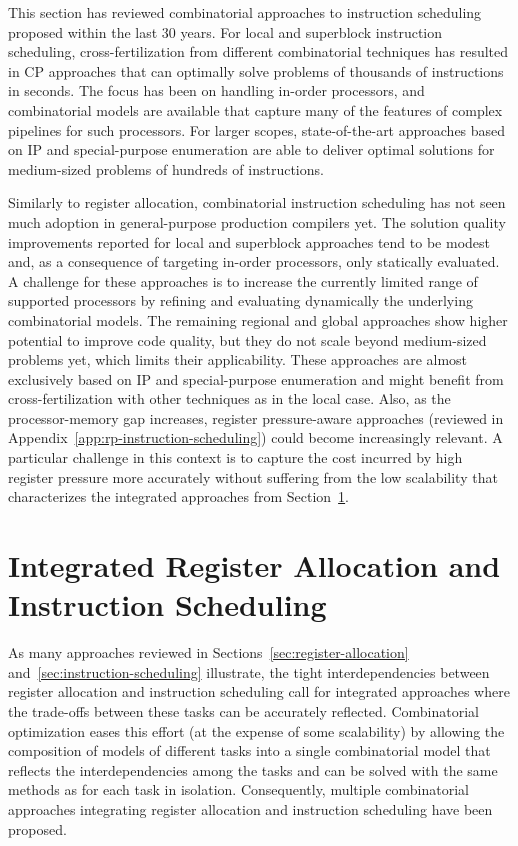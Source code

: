 \documentclass[acmsmall,authorversion,nonacm]{acmart}
\begin{document}
This section has reviewed combinatorial approaches to instruction
scheduling proposed within the last 30 years.
For local and superblock instruction scheduling, cross-fertilization
from different combinatorial techniques has resulted in CP approaches
that can optimally solve problems of thousands of instructions in
seconds.
The focus has been on handling in-order processors, and combinatorial
models are available that capture many of the features of complex
pipelines for such processors.
For larger scopes, state-of-the-art approaches based on IP and
special-purpose enumeration are able to deliver optimal solutions for
medium-sized problems of hundreds of instructions.

Similarly to register allocation, combinatorial instruction scheduling
has not seen much adoption in general-purpose production compilers
yet.
The solution quality improvements reported for local and superblock
approaches tend to be modest and, as a consequence of targeting
in-order processors, only statically evaluated.
A challenge for these approaches is to increase the currently limited
range of supported processors by refining and evaluating dynamically
the underlying combinatorial models.
The remaining regional and global approaches show higher potential to
improve code quality, but they do not scale beyond medium-sized
problems yet, which limits their applicability.
These approaches are almost exclusively based on IP and
special-purpose enumeration and might benefit from cross-fertilization
with other techniques as in the local case.
Also, as the processor-memory gap increases, register pressure-aware
approaches (reviewed in Appendix~\ref{app:rp-instruction-scheduling})
could become increasingly relevant.
A particular challenge in this context is to capture the cost incurred
by high register pressure more accurately without suffering from the
low scalability that characterizes the integrated approaches from
Section~\ref{sec:integrated}.

\section{Integrated Register Allocation and Instruction Scheduling}\label{sec:integrated}

As many approaches reviewed in Sections~\ref{sec:register-allocation}
and~\ref{sec:instruction-scheduling} illustrate, the tight
interdependencies between register allocation and instruction
scheduling call for integrated approaches where the trade-offs between
these tasks can be accurately reflected.
Combinatorial optimization eases this effort (at the expense of some
scalability) by allowing the composition of models of different tasks
into a single combinatorial model that reflects the interdependencies
among the tasks and can be solved with the same methods as for each
task in isolation.
Consequently, multiple combinatorial approaches integrating register
allocation and instruction scheduling have been proposed.
\end{document}

